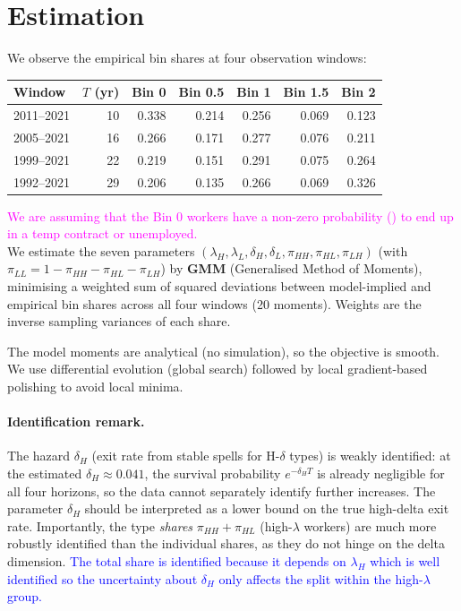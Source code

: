 \documentclass[12pt,a4paper]{article}
\begin{document}
\section{Estimation}

We observe the empirical bin shares at four observation windows:

\begin{center}
\begin{tabular}{lrrrrrr}
\toprule
Window & $T$ (yr) & Bin 0 & Bin 0.5 & Bin 1 & Bin 1.5 & Bin 2\\
\midrule
2011--2021 & 10 & 0.338 & 0.214 & 0.256 & 0.069 & 0.123\\
2005--2021 & 16 & 0.266 & 0.171 & 0.277 & 0.076 & 0.211\\
1999--2021 & 22 & 0.219 & 0.151 & 0.291 & 0.075 & 0.264\\
1992--2021 & 29 & 0.206 & 0.135 & 0.266 & 0.069 & 0.326\\
\bottomrule
\end{tabular}
\end{center}

\textcolor{magenta}{\small{We are assuming that the Bin 0 workers have a non-zero probability (\delta) to end up in a temp contract or unemployed.}}
\\
\noindent
We estimate the seven parameters $(\lambda_H, \lambda_L, \delta_H, \delta_L, \pi_{HH},
\pi_{HL}, \pi_{LH})$ (with $\pi_{LL} = 1 - \pi_{HH} - \pi_{HL} - \pi_{LH}$) by
\textbf{GMM} (Generalised Method of Moments), minimising a weighted sum of squared deviations between model-implied and
empirical bin shares across all four windows (20 moments). Weights are the inverse
sampling variances of each share.

The model moments are analytical (no simulation), so the objective is smooth. We use
differential evolution (global search) followed by local gradient-based polishing to
avoid local minima.

\paragraph{Identification remark.} The hazard $\delta_H$ (exit rate from stable spells
for H-$\delta$ types) is weakly identified: at the estimated $\delta_H \approx 0.041$,
the survival probability $e^{-\delta_H T}$ is already negligible for all four horizons,
so the data cannot separately identify further increases. The parameter $\delta_H$
should be interpreted as a lower bound on the true high-delta exit rate. Importantly,
the type \emph{shares} $\pi_{HH} + \pi_{HL}$ (high-$\lambda$ workers) are much more
robustly identified than the individual shares, as they do not hinge on the delta
dimension. \textcolor{blue}{The total share is identified because it depends on $\lambda_H$ which is well identified so the uncertainty about $\delta_H$ only affects the split within the high-$\lambda$ group.}
\end{document}
